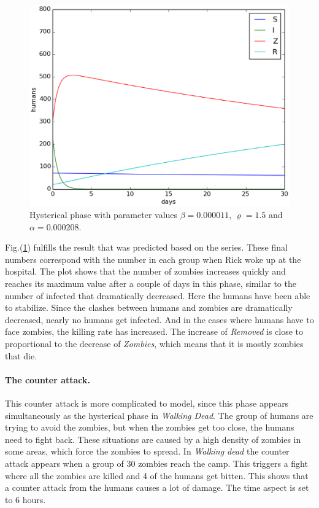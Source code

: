 \documentclass[%
twoside,                 %
final,                   %
10pt]{article}
\begin{document}
\begin{figure}[ht]
  \centerline{\includegraphics[width=0.9\linewidth]{plots/WD_zombie_hysterical_1.eps}}
  \caption{
  \label{fig:hysterical_1} Hysterical phase with parameter values $\beta = 0.000011$, $\varrho = 1.5$ and $\alpha = 0.000208$.
  }
\end{figure}


Fig.(\ref{fig:hysterical_1}) fulfills the result that was predicted based on the series. These final numbers correspond with the number in each group when Rick woke up at the hospital. The plot shows that the number of zombies increases quickly and reaches its maximum value after a couple of days in this phase, similar to the number of infected that dramatically decreased. Here the humans have been able to stabilize. Since the clashes between humans and zombies are dramatically decreased, nearly no humans get infected. And in the cases where humans have to face zombies, the killing rate has increased. The increase of \emph{Removed} is close to proportional to the decrease of \emph{Zombies}, which means that it is mostly zombies that die.

\paragraph{The counter attack.}
\label{section:counter_attack}
This counter attack is more complicated to model, since this phase appears simultaneously as the hysterical phase in \emph{Walking Dead}. The group of humans are trying to avoid the zombies, but when the zombies get too close, the humans need to fight back. These situations are caused by a high density of zombies in some areas, which force the zombies to spread. In \emph{Walking dead} the counter attack appears when a group of 30 zombies reach the camp. This triggers a fight where all the zombies are killed and 4 of the humans get bitten. This shows that a counter attack from the humans causes a lot of damage. The time aspect is set to 6 hours.  
\end{document}
